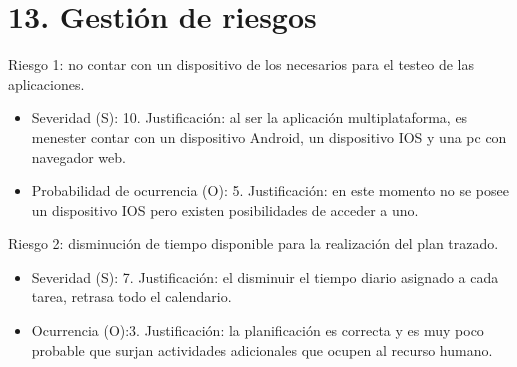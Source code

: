 \documentclass[
11pt, %
]{charter}
\begin{document}
\section{13. Gestión de riesgos}
\label{sec:riesgos}


 
Riesgo 1: no contar con un dispositivo de los necesarios para el testeo de las aplicaciones.
\begin{itemize}
	\item Severidad (S): 10.\newline 
	Justificación: al ser la aplicación multiplataforma, es menester contar con un dispositivo Android, un dispositivo IOS y una pc con navegador web.
	\item Probabilidad de ocurrencia (O): 5.\newline 
	Justificación: en este momento no se posee un dispositivo IOS pero existen posibilidades de acceder a uno.
\end{itemize}   

Riesgo 2: disminución de tiempo disponible para la realización del plan trazado.
\begin{itemize}
	\item Severidad (S): 7. \newline 
	Justificación: el disminuir el tiempo diario asignado a cada tarea, retrasa todo el calendario.
	\item Ocurrencia (O):3. \newline 
	Justificación: la planificación es correcta y es muy poco probable que surjan actividades adicionales que ocupen al recurso humano.
\end{itemize}
\end{document}
